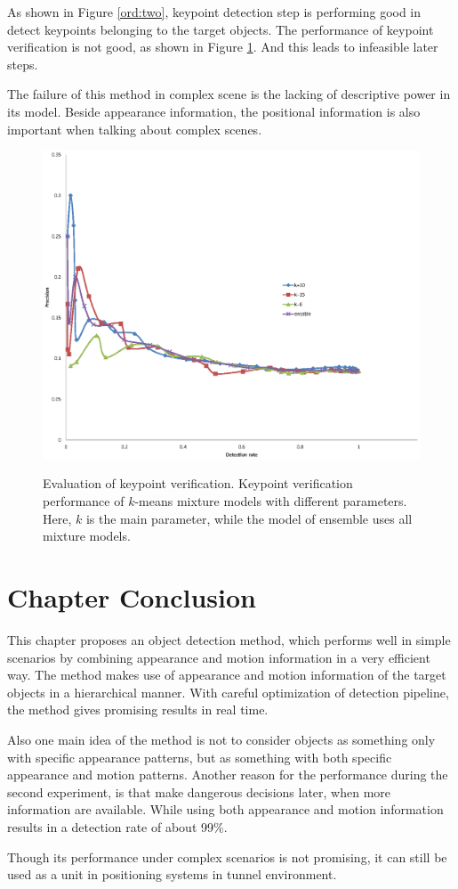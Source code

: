 As shown in Figure \ref{ord:two}, keypoint detection step is performing good in detect keypoints belonging to the target objects. The performance of keypoint verification is not good, as shown in Figure \ref{ord:one}. And this leads to infeasible later steps.

The failure of this method in complex scene is the lacking of descriptive power in its model. Beside appearance information, the positional information is also important when talking about complex scenes.

\begin{figure}
\centering
{
  \includegraphics[width=1\textwidth]{kptkms.eps}
}
\caption[Evaluation of keypoint verification]{Evaluation of keypoint verification. Keypoint verification performance of $k$-means mixture models with different parameters. Here, $k$ is the main parameter, while the model of ensemble uses all mixture models.}
\label{ord:one}
\end{figure}

\section{Chapter Conclusion}
\label{conc}
 This chapter proposes an object detection method, which performs well in simple scenarios by combining appearance and motion information in a very efficient way. The method makes use of appearance and motion information of the target objects in a hierarchical manner. With careful optimization of detection pipeline, the method gives promising results in real time.

  Also one main idea of the method is not to consider objects as something only with specific appearance patterns, but as something with both
 specific appearance and motion patterns. Another reason for the performance during the second experiment, is that make dangerous decisions later, when more information are available. While using both appearance and motion information results in a detection rate of about 99\%.

 Though its performance under complex scenarios is not promising, it can still be used as a unit in  positioning systems in tunnel environment.
